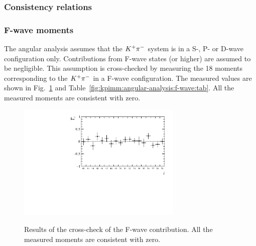 \subsubsection{Consistency relations}

\subsubsection{F-wave moments}

The angular analysis assumes that the ${{K}^+}{{\pi}^-}$ system is in a S-, P- or D-wave configuration only.  Contributions from F-wave states (or higher) are assumed to be negligible.  This assumption is cross-checked by measuring the 18 moments corresponding to the ${{K}^+}{{\pi}^-}$ in a F-wave configuration. The measured values are shown in Fig.~\ref{fig:kpimm:angular-analysis:f-wave:fig} and Table~\ref{fig:kpimm:angular-analysis:f-wave:tab}.  All the measured moments are consistent with zero.  
  
\begin{figure}[!htb]
\caption{Results of the cross-check of the F-wave contribution. All the measured moments are consistent with zero.}
\centering
\includegraphics[width=0.7\textwidth]{figs/kpimm/angular-analysis/f-wave-moments.pdf}
\label{fig:kpimm:angular-analysis:f-wave:fig}
\end{figure}

